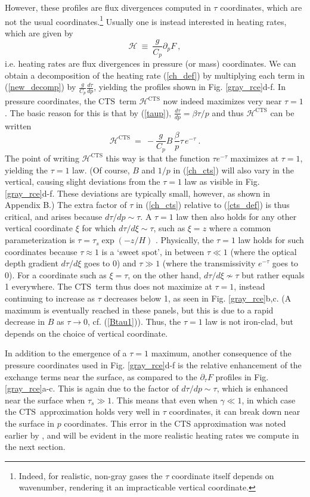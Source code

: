 \documentclass{ametsoc}
\newcommand{\beqn}{\begin{equation}}
\newcommand{\eeqn}{\end{equation}}
\newcommand{\eqnref}[1]{(\ref{#1})}
\newcommand{\der}[2]{\ensuremath{\frac{d #1}{d #2}}}
\newcommand{\ppp}{\ensuremath{\partial_p}}
\newcommand{\pptau}{\ensuremath{\partial_\tau}}
\newcommand{\Cp}{\ensuremath{C_p}}
\newcommand{\ch}{\ensuremath{\mathcal{H}}}
\newcommand{\taus}{\ensuremath{\tau_s}}
\newcommand{\CTS}{\ensuremath{\mathrm{CTS}}}
\begin{document}
However, these profiles are flux divergences computed in $\tau$ coordinates, which are not the usual coordinates.\footnote{Indeed, for realistic, non-gray gases the $\tau$ coordinate itself depends on wavenumber, rendering it an impracticable vertical coordinate.} Usually one is instead interested in heating rates, which are given by
\beqn
	\ch \ \equiv \ \frac{g}{\Cp}  \ppp F \ ,
	\label{ch_def}
\eeqn 
i.e. heating rates are flux divergences in pressure (or mass) coordinates. We can obtain a decomposition of the heating rate \eqnref{ch_def} by multiplying each term in \eqnref{new_decomp} by $\frac{g}{\Cp}\der{\tau}{p}$, yielding the profiles shown in Fig. \ref{gray_rce}d-f. In pressure coordinates, the \CTS\ term $\ch^{\CTS}$ now indeed maximizes very near $\tau=1$. The basic reason for this is that by \eqnref{taup}, $\der{\tau}{p} = \beta \tau/p$ and thus $\ch^{\CTS}$ can be written
\beqn
	\ch^{\CTS} \ = \ -\frac{g}{\Cp}B\, \frac{\beta}{p}\tau\, e^{-\tau} \ .
	\label{ch_cts}
\eeqn
The point of writing $\ch^{\CTS}$ this way is that  the function $\tau e^{-\tau}$ maximizes at $\tau=1$, yielding the $\tau=1$ law. (Of course, $B$ and $1/p$ in \eqnref{ch_cts} will also vary in the vertical, causing slight deviations from the $\tau=1$ law as visible in Fig. \ref{gray_rce}d-f. These deviations are typically small, however, as shown in Appendix B.) The extra factor of $\tau$ in \eqnref{ch_cts} relative to \eqnref{cts_def} is thus critical, and arises because $d \tau/dp \sim \tau$. A $\tau=1$ law then also holds for any other vertical coordinate $\xi$ for which $d \tau/d\xi \sim \tau$, such as $\xi=z$ where a common parameterization is $\tau=\taus \exp(-z/H)$  \citep[e.g.][]{huang2014,weaver1995,held1982}.  Physically, the $\tau=1$ law holds for such coordinates because $\tau\approx 1$ is a `sweet spot', in between $\tau \ll 1$ (where the optical depth gradient $d \tau/d\xi$ goes to 0) and $\tau \gg 1$  (where the transmissivity $e^{-\tau}$ goes to 0). For a coordinate such as $\xi=\tau$, on the other hand, $d \tau/d\xi \nsim\tau$ but rather equals 1 everywhere. The \CTS\ term thus does not maximize at $\tau=1$, instead continuing to increase as $\tau$ decreases below 1, as seen in Fig. \ref{gray_rce}b,c. (A maximum is eventually reached in these panels, but this is due to a rapid decrease in $B$ as $\tau\rightarrow 0$, cf. \eqnref{Btau1}). Thus, the $\tau=1$ law is not iron-clad, but depends on the choice of vertical coordinate.

In addition to the emergence of a $\tau=1$ maximum, another consequence of the pressure coordinates used in  Fig. \ref{gray_rce}d-f is the relative enhancement of the exchange terms near the surface, as compared  to the $\pptau F$ profiles in Fig. \ref{gray_rce}a-c. This is again due to the factor of $d \tau/dp\sim \tau$, which is enhanced near the surface when $\taus \gg 1$. This means that even when $\gamma \ll1$, in which case the \CTS\ approximation holds very well in $\tau$ coordinates, it can break down near the surface in $p$ coordinates. This error in the CTS approximation was noted earlier by \cite{joseph1976}, and will be evident in the more realistic heating rates we compute in the next section.
\end{document}
